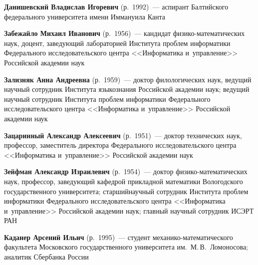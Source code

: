 \begin{multicols}{2}
\vspace*{3pt}

\noindent
\textbf{Данишевский Владислав Игоревич} (р.\ 1992)~---
аспирант Балтийского федерального университета имени Иммануила Канта


\columnbreak

\noindent
\textbf{Забежайло Михаил Иванович} (р.\ 1956)~--- кандидат 
фи\-зи\-ко-ма\-те\-ма\-ти\-че\-ских наук, доцент, заведующий лабораторией 
Института проб\-лем информатики Федерального исследовательского центра 
<<Информатика и~управ\-ле\-ние>> Российской академии наук

\vspace*{3pt}

\noindent
\textbf{Зализняк Анна Андреевна} (р.\ 1959)~--- доктор филологических наук, 
ведущий научный сотрудник Ин\-ститута языкознания Российской академии наук;
ведущий научный сотрудник Института \mbox{проб\-лем} информатики Федерального 
исследовательского центра <<Информатика и~управ\-ле\-ние>> Российской академии наук

\vspace*{3pt}

\noindent
\textbf{Зацаринный Александр Алексеевич} (р.\ 1951)~--- 
доктор технических наук, профессор, заместитель директора Федерального 
исследовательского центра <<Информатика и~управ\-ле\-ние>> Российской академии наук 

\vspace*{3pt}

\noindent
\textbf{Зейфман Александр Израилевич} (р.\ 1954)~---
 доктор фи\-зи\-ко-ма\-те\-ма\-ти\-че\-ских наук, профессор, заведующий кафедрой 
 прикладной математики Вологодского государственного университета; 
 старший\linebreak на\-уч\-ный сотрудник Института проб\-лем информатики Федерального 
 исследовательского центра <<Информатика и~управ\-ле\-ние>> 
 Российской академии наук; главный научный сотрудник ИСЭРТ РАН 
 
 \vspace*{3pt}

\noindent
\textbf{Каданер Арсений Ильич} (р.\ 1995)~---
 студент ме\-ха\-ни\-ко-ма\-те\-ма\-ти\-че\-ско\-го факультета Московского 
 государственного университета им.\ М.\,В.~Ломоносова; аналитик Сбербанка России
 
 \vspace*{3pt}


\end{multicols}
